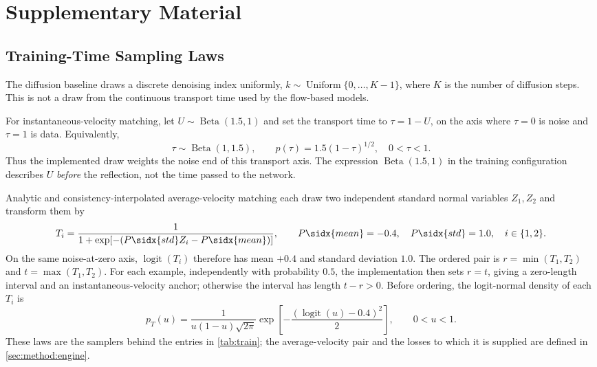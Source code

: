 \chapter{Supplementary Material}\label{app:derivations}\label{app:supplementary}

\section{Training-Time Sampling Laws}\label{app:training-time-laws}


The diffusion baseline draws a discrete denoising index uniformly,
$k\sim\operatorname{Uniform}\{0,\ldots,K-1\}$, where $K$ is the number of diffusion steps. This is not
a draw from the continuous transport time used by the flow-based models.

For instantaneous-velocity matching, let $U\sim\operatorname{Beta}(1.5,1)$ and set the transport
time to $\tau=1-U$, on the axis where $\tau=0$ is noise and $\tau=1$ is data. Equivalently,
\begin{equation}
  \tau\sim\operatorname{Beta}(1,1.5),\qquad
  p(\tau)=1.5(1-\tau)^{1/2},\quad 0<\tau<1.
\end{equation}
Thus the implemented draw weights the noise end of this transport axis. The expression
$\operatorname{Beta}(1.5,1)$ in the training configuration describes $U$ \emph{before} the reflection,
not the time passed to the network.

Analytic and consistency-interpolated average-velocity matching each draw two independent standard
normal variables $Z_1,Z_2$ and transform them by
\begin{equation}
  T_i=\frac{1}{1+\exp[-(P\sidx{std}Z_i-P\sidx{mean})]},\qquad
  P\sidx{mean}=-0.4,\quad P\sidx{std}=1.0,\quad i\in\{1,2\}.
\end{equation}
On the same noise-at-zero axis, $\operatorname{logit}(T_i)$ therefore has mean $+0.4$ and standard
deviation $1.0$. The ordered pair is $r=\min(T_1,T_2)$ and $t=\max(T_1,T_2)$. For each example,
independently with probability $0.5$, the implementation then sets $r=t$, giving a zero-length interval and an
instantaneous-velocity anchor; otherwise the interval has length $t-r>0$. Before ordering, the
logit-normal density of each $T_i$ is
\begin{equation}
  p_T(u)=\frac{1}{u(1-u)\sqrt{2\pi}}
  \exp\!\left[-\frac{(\operatorname{logit}(u)-0.4)^2}{2}\right],\qquad 0<u<1.
\end{equation}
These laws are the samplers behind the entries in \autoref{tab:train}; the average-velocity pair and
the losses to which it is supplied are defined in \autoref{sec:method:engine}.

